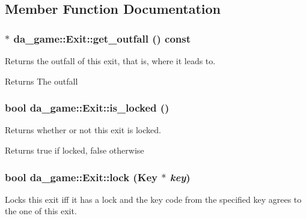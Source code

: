 \subsection{Member Function Documentation}
\hypertarget{classda__game_1_1Exit_ad4f4951039d5d7ca57fce2120e8390f4}{
\subsubsection[{get\_\-outfall}]{ $\ast$ da\_\-game::Exit::get\_\-outfall () const}}
\label{classda__game_1_1Exit_ad4f4951039d5d7ca57fce2120e8390f4}
Returns the outfall of this exit, that is, where it leads to.

\begin{DoxyReturn}{Returns}
The outfall 
\end{DoxyReturn}
\hypertarget{classda__game_1_1Exit_a469187cf61ab5285b71ac4fb103f10b1}{
\subsubsection[{is\_\-locked}]{\setlength{\rightskip}{0pt plus 5cm}bool da\_\-game::Exit::is\_\-locked ()}}
\label{classda__game_1_1Exit_a469187cf61ab5285b71ac4fb103f10b1}
Returns whether or not this exit is locked.

\begin{DoxyReturn}{Returns}
true if locked, false otherwise 
\end{DoxyReturn}
\hypertarget{classda__game_1_1Exit_a252eecd61a98bec46db93185745deff5}{
\subsubsection[{lock}]{\setlength{\rightskip}{0pt plus 5cm}bool da\_\-game::Exit::lock ({\bf Key} $\ast$ {\em key})}}
\label{classda__game_1_1Exit_a252eecd61a98bec46db93185745deff5}
Locks this exit iff it has a lock and the key code from the specified key agrees to the one of this exit.


